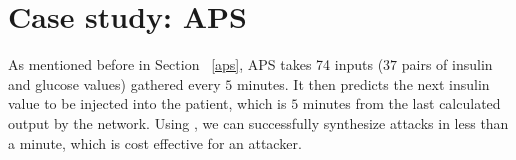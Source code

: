 \section{Case study: APS}

As mentioned before in Section ~\ref{aps}, \ac{APS} takes 74 inputs ($37$ pairs of insulin and glucose values) gathered every $5$ minutes. 
It then predicts the next insulin value to be injected into the patient, which is $5$ minutes from the last calculated output by the network. 
%
Using \tool, we can successfully synthesize attacks in less than a minute, which is cost effective for an attacker.






